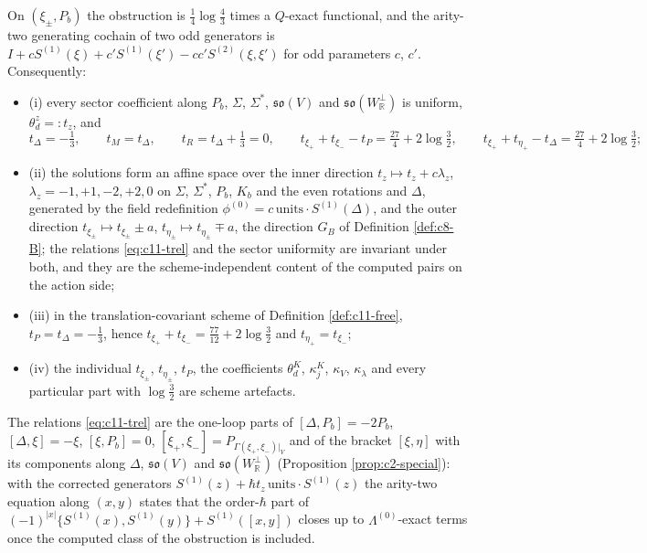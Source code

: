 \begin{theorem}
On $(\xi_\pm,P_b)$ the obstruction is $\tfrac14\log\tfrac43$ times a $Q$-exact functional, and the arity-two generating cochain of two odd generators is $I+cS^{(1)}(\xi)+c'S^{(1)}(\xi')-cc'S^{(2)}(\xi,\xi')$ for odd parameters $c$, $c'$. Consequently:
\begin{itemize}
\item (i) every sector coefficient along $P_b$, $\Sigma$, $\Sigma^*$, $\mathfrak{so}(V)$ and $\mathfrak{so}(W_{\mathbb R}^\perp)$ is uniform, $\theta^z_d=:t_z$, and
\begin{equation}
t_\Delta=-\tfrac13,\qquad t_M=t_\Delta,\qquad t_R=t_\Delta+\tfrac13=0,\qquad t_{\xi_+}+t_{\xi_-}-t_P=\tfrac{27}4+2\log\tfrac32,\qquad t_{\xi_+}+t_{\eta_+}-t_\Delta=\tfrac{27}4+2\log\tfrac32;
\label{eq:c11-trel}
\end{equation}
\item (ii) the solutions form an affine space over the inner direction $t_z\mapsto t_z+c\lambda_z$, $\lambda_z=-1,+1,-2,+2,0$ on $\Sigma$, $\Sigma^*$, $P_b$, $K_b$ and the even rotations and $\Delta$, generated by the field redefinition $\phi^{(0)}=c\,\text{units}\cdot S^{(1)}(\Delta)$, and the outer direction $t_{\xi_\pm}\mapsto t_{\xi_\pm}\pm a$, $t_{\eta_\pm}\mapsto t_{\eta_\pm}\mp a$, the direction $G_B$ of Definition \ref{def:c8-B}; the relations \eqref{eq:c11-trel} and the sector uniformity are invariant under both, and they are the scheme-independent content of the computed pairs on the action side;
\item (iii) in the translation-covariant scheme of Definition \ref{def:c11-free}, $t_P=t_\Delta=-\tfrac13$, hence $t_{\xi_+}+t_{\xi_-}=\tfrac{77}{12}+2\log\tfrac32$ and $t_{\eta_+}=t_{\xi_-}$;
\item (iv) the individual $t_{\xi_\pm}$, $t_{\eta_\pm}$, $t_P$, the coefficients $\theta^K_d$, $\kappa^K_j$, $\kappa_V$, $\kappa_\lambda$ and every particular part with $\log\tfrac32$ are scheme artefacts.
\end{itemize}
The relations \eqref{eq:c11-trel} are the one-loop parts of $[\Delta,P_b]=-2P_b$, $[\Delta,\xi]=-\xi$, $[\xi,P_b]=0$, $[\xi_+,\xi_-]=P_{\Gamma(\xi_+,\xi_-)|_V}$ and of the bracket $[\xi,\eta]$ with its components along $\Delta$, $\mathfrak{so}(V)$ and $\mathfrak{so}(W_{\mathbb R}^\perp)$ (Proposition \ref{prop:c2-special}): with the corrected generators $S^{(1)}(z)+\hbar t_z\,\text{units}\cdot S^{(1)}(z)$ the arity-two equation along $(x,y)$ states that the order-$\hbar$ part of $(-1)^{|x|}\{S^{(1)}(x),S^{(1)}(y)\}+S^{(1)}([x,y])$ closes up to $\Lambda^{(0)}$-exact terms once the computed class of the obstruction is included.
\end{theorem}

